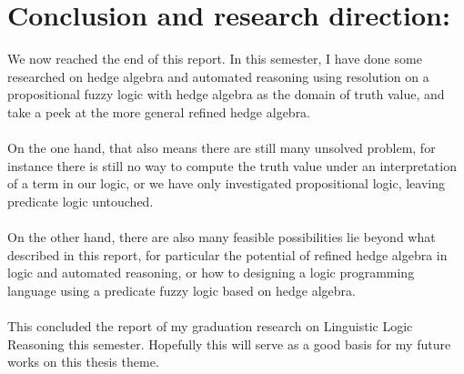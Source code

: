 \documentclass[26pt,fleqn,]{article}
\begin{document}
\section{Conclusion and research direction:}
We now reached the end of this report. In this semester, I have done some researched on hedge algebra and
automated reasoning using resolution on a propositional fuzzy logic with hedge algebra as the domain 
of truth value, and take a peek at the more general refined hedge algebra. \\\\
On the one hand, that also means there are still many unsolved problem, for instance there is still no way to 
compute the truth value under an interpretation of a term in our logic, or we have only investigated
propositional logic, leaving predicate logic untouched. \\\\
On the other hand, there are also many feasible possibilities lie beyond what described in this report,
for particular the potential of refined hedge algebra in logic and automated reasoning, or how to 
designing a logic programming language using a predicate fuzzy logic based on hedge algebra. 
\\\\
This concluded the report of my graduation research on Linguistic Logic Reasoning this semester.
Hopefully this will serve as a good basis for my future works on this thesis theme. 
\end{document}
